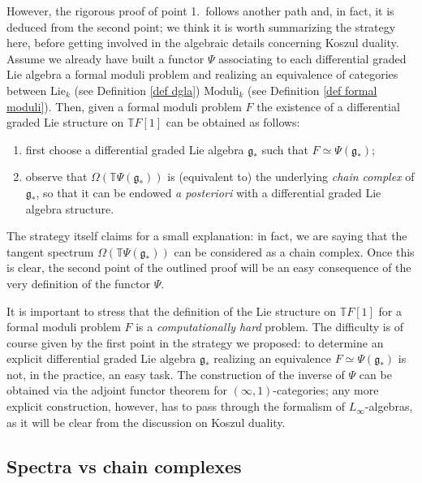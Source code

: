 \begin{refsection}
However, the rigorous proof of point 1.\ follows another path and, in fact, it is deduced from the second point; we think it is worth summarizing the strategy here, before getting involved in the algebraic details concerning Koszul duality. Assume we already have built a functor $\Psi$ associating to each differential graded Lie algebra a formal moduli problem and realizing an equivalence of categories between $\mathrm{Lie}_k$ (see Definition \ref{def dgla}) $\mathrm{Moduli}_k$ (see Definition \ref{def formal moduli}). Then, given a formal moduli problem $F$ the existence of a differential graded Lie structure on $\mathbb T F[1]$ can be obtained as follows: 
\begin{enumerate}
\item first choose a differential graded Lie algebra $\mathfrak g_*$ such that $F \simeq \Psi(\mathfrak g_*)$;
\item observe that $\Omega (\mathbb T \Psi(\mathfrak g_*))$ is (equivalent to) the underlying \emph{chain complex} of $\mathfrak g_*$, so that it can be endowed \emph{a posteriori} with a differential graded Lie algebra structure.
\end{enumerate}

The strategy itself claims for a small explanation: in fact, we are saying that the tangent spectrum $\Omega(\mathbb T \Psi(\mathfrak g_*))$ can be considered as a chain complex. Once this is clear, the second point of the outlined proof will be an easy consequence of the very definition of the functor $\Psi$.

\begin{rmk}
It is important to stress that the definition of the Lie structure on $\mathbb T F[1]$ for a formal moduli problem $F$ is a \emph{computationally hard} problem. The difficulty is of course given by the first point in the strategy we proposed: to determine an explicit differential graded Lie algebra $\mathfrak g_*$ realizing an equivalence $F \simeq \Psi(\mathfrak g_*)$ is not, in the practice, an easy task. The construction of the inverse of $\Psi$ can be obtained via the adjoint functor theorem for $(\infty,1)$-categories; any more explicit construction, however, has to pass through the formalism of $L_\infty$-algebras, as it will be clear from the discussion on Koszul duality.
\end{rmk}

\subsection{Spectra vs chain complexes}


\end{refsection}
